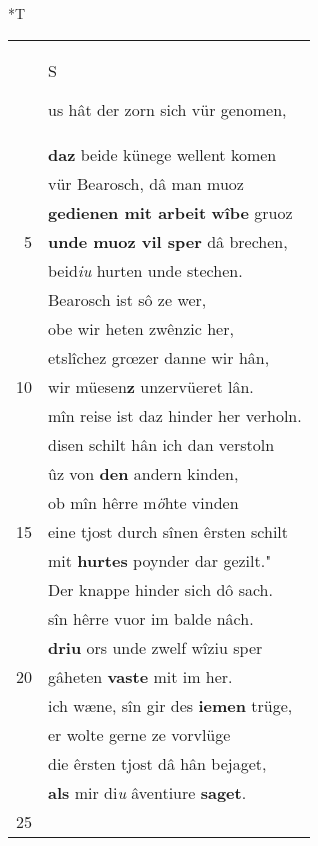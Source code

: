\documentclass[8pt,a4paper,notitlepage]{article}
\begin{document}
\begin{table}[ht]
\begin{minipage}[t]{0.5\linewidth}
\end{minipage}
\hspace{0.5cm}
\begin{minipage}[t]{0.5\linewidth}
\small
\begin{center}*T
\end{center}
\begin{tabular}{rl}
 & \begin{large}S\end{large}us hât der zorn sich vür genomen,\\ 
 & \textbf{daz} beide künege wellent komen\\ 
 & vür Bearosch, dâ man muoz\\ 
 & \textbf{gedienen mit arbeit} \textbf{wîbe} gruoz\\ 
5 & \textbf{unde muoz vil sper} dâ brechen,\\ 
 & beid\textit{iu} hurten unde stechen.\\ 
 & Bearosch ist sô ze wer,\\ 
 & obe wir heten zwênzic her,\\ 
 & etslîchez grœzer danne wir hân,\\ 
10 & wir müesen\textbf{z} unzervüeret lân.\\ 
 & mîn reise ist daz hinder her verholn.\\ 
 & disen schilt hân ich dan verstoln\\ 
 & ûz von \textbf{den} andern kinden,\\ 
 & ob mîn hêrre m\textit{ö}hte vinden\\ 
15 & eine tjost durch sînen êrsten schilt\\ 
 & mit \textbf{hurtes} poynder dar gezilt."\\ 
 & Der knappe hinder sich dô sach.\\ 
 & sîn hêrre vuor im balde nâch.\\ 
 & \textbf{driu} ors unde zwelf wîziu sper\\ 
20 & gâheten \textbf{vaste} mit im her.\\ 
 & ich wæne, sîn gir des \textbf{iemen} trüge,\\ 
 & er wolte gerne ze vorvlüge\\ 
 & die êrsten tjost dâ hân bejaget,\\ 
 & \textbf{als} mir di\textit{u} âventiure \textbf{saget}.\\ 
25 & \textbf{\begin{large}D\end{large}er knappe sprach} ze Gawan:\\ 

\end{tabular}
\end{minipage}
\end{table}
\end{document}
